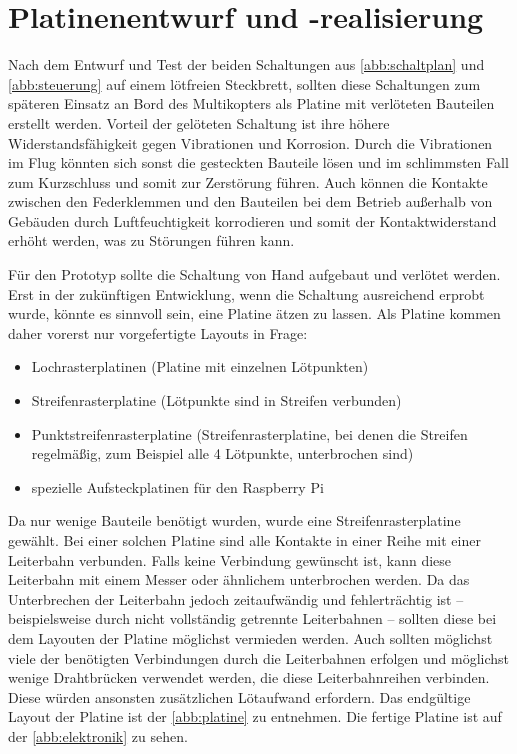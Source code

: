 \documentclass[a4paper,12pt,bibliography=totoc, listof=totoc,titlepage,pointlessnumbers]{scrreprt}
\begin{document}
\section{Platinenentwurf und -realisierung}
Nach dem Entwurf und Test der beiden Schaltungen aus \autoref{abb:schaltplan} und \autoref{abb:steuerung} auf einem lötfreien Steckbrett, sollten diese Schaltungen zum späteren Einsatz an Bord des Multikopters als Platine mit verlöteten Bauteilen erstellt werden. Vorteil der gelöteten Schaltung ist ihre höhere Widerstandsfähigkeit gegen Vibrationen und Korrosion. Durch die Vibrationen im Flug könnten sich sonst die gesteckten Bauteile lösen und im schlimmsten Fall zum Kurzschluss und somit zur Zerstörung füh\-ren. Auch können die Kontakte zwischen den Federklemmen und den Bauteilen bei dem Betrieb außerhalb von Gebäuden durch Luftfeuchtigkeit korrodieren und somit der Kontaktwiderstand erhöht werden, was zu Störungen füh\-ren kann.

Für den Prototyp sollte die Schaltung von Hand aufgebaut und verlötet werden. Erst in der zukünftigen Entwicklung, wenn die Schaltung ausreichend erprobt wurde, könnte es sinnvoll sein, eine Platine ätzen zu lassen. Als Platine kommen daher vorerst nur vorgefertigte Layouts in Frage:

\begin{itemize}
 \item Lochrasterplatinen (Platine mit einzelnen Lötpunkten)
 \item Streifenrasterplatine (Lötpunkte sind in Streifen verbunden)
 \item Punktstreifenrasterplatine (Streifenrasterplatine, bei denen die Streifen re\-gel\-mä\-ßig, zum Beispiel alle 4 Lötpunkte, unterbrochen sind)
 \item spezielle Aufsteckplatinen für den Rasp\-berry Pi
\end{itemize}

Da nur wenige Bauteile benötigt wurden, wurde eine Streifenrasterplatine gewählt. Bei einer solchen Platine sind alle Kontakte in einer Reihe mit einer Leiterbahn verbunden. Falls keine Verbindung gewünscht ist, kann diese Leiterbahn mit einem Messer oder ähnlichem unterbrochen werden. Da das Unterbrechen der Leiterbahn jedoch zeitaufwändig und fehlerträchtig ist -- beispielsweise durch nicht vollständig getrennte Leiterbahnen -- sollten diese bei dem Layouten der Platine möglichst vermieden werden. Auch sollten möglichst viele der benötigten Verbindungen durch die Leiterbahnen erfolgen und möglichst wenige Drahtbrücken verwendet werden, die diese Leiterbahnreihen verbinden. Diese würden ansonsten zu\-sätz\-lichen Lötaufwand erfordern. Das endgültige Layout der Platine ist der \autoref{abb:platine} zu entnehmen. Die fertige Platine ist auf der \autoref{abb:elektronik} zu sehen.
\end{document}
